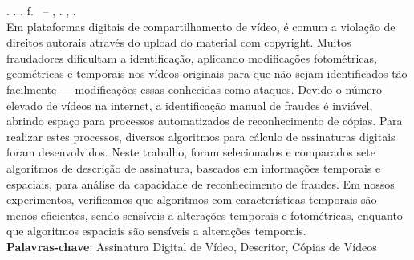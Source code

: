 
\begin{resumo}[RESUMO]
\begin{SingleSpacing}

\imprimirautorcitacao. \imprimirtitulo. \imprimirdata. \pageref {LastPage} f. \imprimirprojeto\ – \imprimirprograma, \imprimirinstituicao. \imprimirlocal, \imprimirdata.\\


Em plataformas digitais de compartilhamento de vídeo, é comum a violação de direitos autorais através do upload do material com copyright. Muitos fraudadores dificultam a identificação, aplicando modificações fotométricas, geométricas e temporais nos vídeos originais para que não sejam identificados tão facilmente --- modificações essas conhecidas como ataques. Devido o número elevado de vídeos na internet, a identificação manual de fraudes é inviável, abrindo espaço para processos automatizados de reconhecimento de cópias. Para realizar estes processos, diversos algoritmos para cálculo de assinaturas digitais foram desenvolvidos. Neste trabalho, foram selecionados e comparados sete algoritmos de descrição de assinatura, baseados em informações temporais e espaciais, para análise da capacidade de reconhecimento de fraudes. Em nossos experimentos, verificamos que algoritmos com características temporais são menos eficientes, sendo sensíveis a alterações temporais e fotométricas, enquanto que algoritmos espaciais são sensíveis a alterações temporais. \\

\textbf{Palavras-chave}: Assinatura Digital de Vídeo, Descritor, Cópias de Vídeos

\end{SingleSpacing}
\end{resumo}


